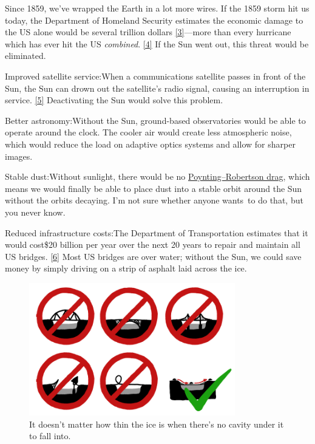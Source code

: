 {{Since 1859, we've wrapped the Earth in a lot more wires. If the 1859 storm hit us today, the Department of Homeland Security estimates the economic damage to the US alone would be several trillion dollars \href{http://www.oecd.org/governance/risk/46891645.pdf}{[3]}—more than every hurricane which has ever hit the US \emph{combined}. \href{http://www.google.com/url?q=http\%3A\%2F\%2Fsciencepolicy.colorado.edu\%2Fadmin\%2Fpublication\_files\%2Fresource-2476-2008.02.pdf&sa=D&sntz=1&usg=AFQjCNFnOWO7P0PV6qJSPhUUf56glVwZKQ}{[4]} If the Sun went out, this threat would be eliminated.}

{Improved satellite service:When a communications satellite passes in front of the Sun, the Sun can drown out the satellite's radio signal, causing an interruption in service. \href{http://www3.alcatel-lucent.com/bstj/vol49-1970/articles/bstj49-8-1943.pdf}{[5]} Deactivating the Sun would solve this problem.}

{Better astronomy:Without the Sun, ground-based observatories would be able to operate around the clock. The cooler air would create less atmospheric noise, which would reduce the load on adaptive optics systems and allow for sharper images.}

{Stable dust:Without sunlight, there would be no \href{http://en.wikipedia.org/wiki/Poynting\%E2\%80\%93Robertson\_effect}{Poynting–Robertson drag}, which means we would finally be able to place dust into a stable orbit around the Sun without the orbits decaying. I’m not sure whether anyone wants to do that, but you never know.}

{Reduced infrastructure costs:The Department of Transportation estimates that it would cost\$20 billion per year over the next 20 years to repair and maintain all US bridges. \href{http://www.fhwa.dot.gov/policy/2010cpr/chap7.htm\#9}{[6]} Most US bridges are over water; without the Sun, we could save money by simply driving on a strip of asphalt laid across the ice.}

\begin{figure}[!htbp]
\centering
\includegraphics[scale=0.5, max width=0.8\textwidth]{imgs/a/49/sunless_bridges.png}
\caption{It doesn't matter how thin the ice is when there's no cavity under it to fall into.}
\end{figure}

}
